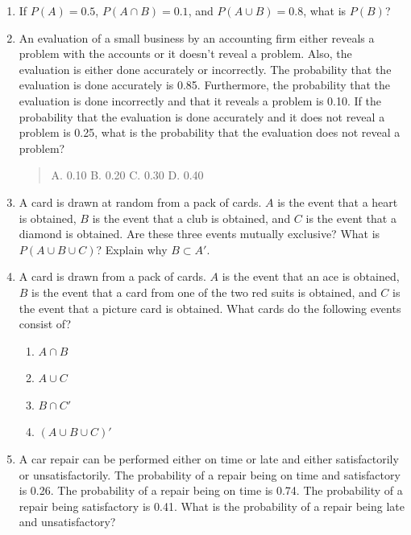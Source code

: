 \documentclass[10pt, twocolumn]{article}
\begin{document}
\begin{enumerate}
     \item[\textbf{1.3.7}] If $P(A) = 0.5$, $P(A \cap B) = 0.1$, and $P(A \cup B) = 0.8$, what is $P(B)$?
 
     \item[\textbf{1.3.8}] An evaluation of a small business by an accounting firm either reveals a problem with the accounts or it doesn't reveal a problem. Also, the evaluation is either done accurately or incorrectly. The probability that the evaluation is done accurately is 0.85. Furthermore, the probability that the evaluation is done incorrectly and that it reveals a problem is 0.10. If the probability that the evaluation is done accurately and it does not reveal a problem is 0.25, what is the probability that the evaluation does not reveal a problem?
    \begin{quote}
        A. 0.10 \quad B. 0.20 \quad C. 0.30 \quad D. 0.40
    \end{quote}

    \item[\textbf{1.3.9}] A card is drawn at random from a pack of cards. $A$ is the event that a heart is obtained, $B$ is the event that a club is obtained, and $C$ is the event that a diamond is obtained. Are these three events mutually exclusive? What is $P(A \cup B \cup C)$? Explain why $B \subset A'$.

    \item[\textbf{1.3.10}] A card is drawn from a pack of cards. $A$ is the event that an ace is obtained, $B$ is the event that a card from one of the two red suits is obtained, and $C$ is the event that a picture card is obtained. What cards do the following events consist of?
    \begin{enumerate}
        \item[(a)] $A \cap B$
        \item[(b)] $A \cup C$
        \item[(c)] $B \cap C'$
        \item[(d)] $(A \cup B \cup C)'$
    \end{enumerate}

    \item[\textbf{1.3.11}] A car repair can be performed either on time or late and either satisfactorily or unsatisfactorily. The probability of a repair being on time and satisfactory is 0.26. The probability of a repair being on time is 0.74. The probability of a repair being satisfactory is 0.41. What is the probability of a repair being late and unsatisfactory?


\end{enumerate}
\end{document}
